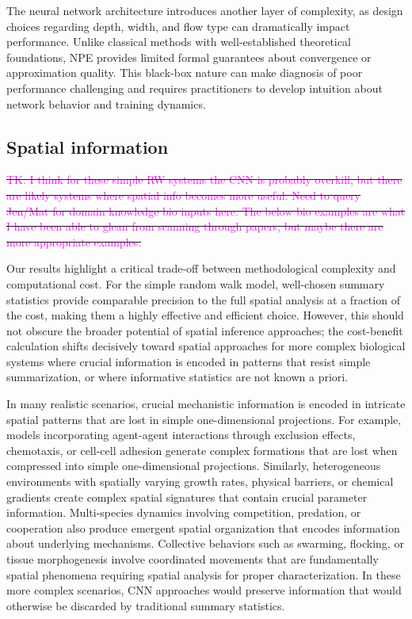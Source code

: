 \documentclass{article}
\makeatletter
\providecommand{\DIFdeltex}[1]{{\protect\color{red}\sout{#1}}} %
\providecommand{\DIFdelbegin}{} %
\providecommand{\DIFdelend}{} %
\providecommand{\DIFdel}[1]{\texorpdfstring{\DIFdeltex{#1}}{}} %
\newcommand{\DIFscaledelfig}{0.5}
\newlength{\DIFdelgraphicswidth} %
\newlength{\DIFdelgraphicsheight} %
\newcommand{\DIFdelincludegraphics}[2][]{%
\sbox{\DIFdelgraphicsbox}{\DIFOincludegraphics[#1]{#2}}%
\settoboxwidth{\DIFdelgraphicswidth}{\DIFdelgraphicsbox} %
\settoboxtotalheight{\DIFdelgraphicsheight}{\DIFdelgraphicsbox} %
\scalebox{\DIFscaledelfig}{%
\parbox[b]{\DIFdelgraphicswidth}{\usebox{\DIFdelgraphicsbox}\\[-\baselineskip] \rule{\DIFdelgraphicswidth}{0em}}\llap{\resizebox{\DIFdelgraphicswidth}{\DIFdelgraphicsheight}{%
\setlength{\unitlength}{\DIFdelgraphicswidth}%
\begin{picture}(1,1)%
\thicklines\linethickness{2pt} %
{\color[rgb]{1,0,0}\put(0,0){\framebox(1,1){}}}%
{\color[rgb]{1,0,0}\put(0,0){\line( 1,1){1}}}%
{\color[rgb]{1,0,0}\put(0,1){\line(1,-1){1}}}%
\end{picture}%
}\hspace*{3pt}}} %
} %
\DeclareRobustCommand{\DIFdelbegin}{\DIFOdelbegin \let\includegraphics\DIFdelincludegraphics} %
\DeclareRobustCommand{\DIFdelend}{\DIFOaddend \let\includegraphics\DIFOincludegraphics} %
\let\sout@orig\sout %
\renewcommand{\sout}[1]{\ifmmode\text{\sout@orig{\ensuremath{#1}}}\else\sout@orig{#1}\fi} %
\makeatother
\begin{document}
The neural network architecture introduces another layer of complexity, as design choices regarding depth, width, and flow type can dramatically impact performance. Unlike classical methods with well-established theoretical foundations, NPE provides limited formal guarantees about convergence or approximation quality. This black-box nature can make diagnosis of poor performance challenging and requires practitioners to develop intuition about network behavior and training dynamics.




\subsection{Spatial information}
\DIFdelbegin %

\DIFdel{\textcolor{magenta}{TK: I think for these simple RW systems the CNN is probably overkill, but there are likely systems where spatial info becomes more useful. Need to query Jen/Mat for domain knowledge bio inputs here. The below bio examples are what I have been able to glean from scanning through papers, but maybe there are more appropriate examples. }
}%

\DIFdelend Our results highlight a critical trade-off between methodological complexity and computational cost. For the simple random walk model, well-chosen summary statistics provide comparable precision to the full spatial analysis at a fraction of the cost, making them a highly effective and efficient choice. However, this should not obscure the broader potential of spatial inference approaches; the cost-benefit calculation shifts decisively toward spatial approaches for more complex biological systems where crucial information is encoded in patterns that resist simple summarization, or where informative statistics are not known a priori.


In many realistic scenarios, crucial mechanistic information is encoded in intricate spatial patterns that are lost in simple one-dimensional projections. For example, models incorporating agent-agent interactions through exclusion effects, chemotaxis, or cell-cell adhesion generate complex formations that are lost when compressed into simple one-dimensional projections. Similarly, heterogeneous environments with spatially varying growth rates, physical barriers, or chemical gradients create complex spatial signatures that contain crucial parameter information. Multi-species dynamics involving competition, predation, or cooperation also produce emergent spatial organization that encodes information about underlying mechanisms. Collective behaviors such as swarming, flocking, or tissue morphogenesis involve coordinated movements that are fundamentally spatial phenomena requiring spatial analysis for proper characterization. In these more complex scenarios, CNN approaches would preserve information that would otherwise be discarded by traditional summary statistics. 
\end{document}
